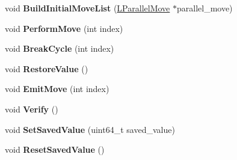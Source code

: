 \begin{DoxyCompactItemize}
\item 
void {\bfseries Build\+Initial\+Move\+List} (\hyperlink{classv8_1_1internal_1_1_l_parallel_move}{L\+Parallel\+Move} $\ast$parallel\+\_\+move)\hypertarget{classv8_1_1internal_1_1_b_a_s_e___e_m_b_e_d_d_e_d_a18e46b4919bd34c5ff192a955f86238d}{}\label{classv8_1_1internal_1_1_b_a_s_e___e_m_b_e_d_d_e_d_a18e46b4919bd34c5ff192a955f86238d}

\item 
void {\bfseries Perform\+Move} (int index)\hypertarget{classv8_1_1internal_1_1_b_a_s_e___e_m_b_e_d_d_e_d_a01fea4beaf81ccc3a326c14fdda8a2aa}{}\label{classv8_1_1internal_1_1_b_a_s_e___e_m_b_e_d_d_e_d_a01fea4beaf81ccc3a326c14fdda8a2aa}

\item 
void {\bfseries Break\+Cycle} (int index)\hypertarget{classv8_1_1internal_1_1_b_a_s_e___e_m_b_e_d_d_e_d_a5de6146d54eea60dd1d47b73b51a4905}{}\label{classv8_1_1internal_1_1_b_a_s_e___e_m_b_e_d_d_e_d_a5de6146d54eea60dd1d47b73b51a4905}

\item 
void {\bfseries Restore\+Value} ()\hypertarget{classv8_1_1internal_1_1_b_a_s_e___e_m_b_e_d_d_e_d_a5dca5ddf8849980c4195449ae562e8b9}{}\label{classv8_1_1internal_1_1_b_a_s_e___e_m_b_e_d_d_e_d_a5dca5ddf8849980c4195449ae562e8b9}

\item 
void {\bfseries Emit\+Move} (int index)\hypertarget{classv8_1_1internal_1_1_b_a_s_e___e_m_b_e_d_d_e_d_a50988d2a86b49713575ec93e3c922dcf}{}\label{classv8_1_1internal_1_1_b_a_s_e___e_m_b_e_d_d_e_d_a50988d2a86b49713575ec93e3c922dcf}

\item 
void {\bfseries Verify} ()\hypertarget{classv8_1_1internal_1_1_b_a_s_e___e_m_b_e_d_d_e_d_a46f1b6e1093c631ee3b7dfca3abc94e9}{}\label{classv8_1_1internal_1_1_b_a_s_e___e_m_b_e_d_d_e_d_a46f1b6e1093c631ee3b7dfca3abc94e9}

\item 
void {\bfseries Set\+Saved\+Value} (uint64\+\_\+t saved\+\_\+value)\hypertarget{classv8_1_1internal_1_1_b_a_s_e___e_m_b_e_d_d_e_d_af9d824c8b26f12e5d67c375be751ae9a}{}\label{classv8_1_1internal_1_1_b_a_s_e___e_m_b_e_d_d_e_d_af9d824c8b26f12e5d67c375be751ae9a}

\item 
void {\bfseries Reset\+Saved\+Value} ()\hypertarget{classv8_1_1internal_1_1_b_a_s_e___e_m_b_e_d_d_e_d_a8fe5100e94be475b4362caf75a3741bd}{}\label{classv8_1_1internal_1_1_b_a_s_e___e_m_b_e_d_d_e_d_a8fe5100e94be475b4362caf75a3741bd}


\end{DoxyCompactItemize}
